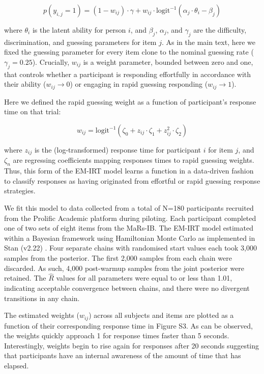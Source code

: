 \documentclass[a4paper,man,natbib]{apa6}
\begin{document}
\begin{equation*}
    p(y_{i,j} = 1) = (1-w_{ij}) \cdot \gamma + w_{ij} \cdot \text{logit}^{-1} \left( \alpha_{j} \cdot \theta_i - \beta_{j} \right)
\end{equation*}

\noindent where $\theta_i$ is the latent ability for person $i$, and $\beta_{j}$, $\alpha_{j}$, and $\gamma_{j}$ are the difficulty, discrimination, and guessing parameters for item $j$. As in the main text, here we fixed the guessing parameter for every item clone to the nominal guessing rate ($\gamma_{j} = 0.25$). Crucially, $w_{ij}$ is a weight parameter, bounded between zero and one, that controls whether a participant is responding effortfully in accordance with their ability ($w_{ij} \rightarrow 0$) or engaging in rapid guessing responding ($w_{ij} \rightarrow 1$).

Here we defined the rapid guessing weight as a function of participant's response time on that trial:

\begin{equation*}
    w_{ij} = \text{logit}^{-1} \left( \zeta_0 + z_{ij} \cdot \zeta_1 + z_{ij}^2 \cdot \zeta_2 \right)
\end{equation*}

\noindent where $z_{ij}$ is the (log-transformed) response time for participant $i$ for item $j$, and  $\zeta_n$ are regressing coefficients mapping responses times to rapid guessing weights. Thus, this form of the EM-IRT model learns a function in a data-driven fashion to classify responses as having originated from effortful or rapid guessing response strategies. 

We fit this model to data collected from a total of N=180 participants recruited from the Prolific Academic platform during piloting. Each participant completed one of two sets of eight items from the MaRs-IB. The EM-IRT model estimated within a Bayesian framework using Hamiltonian Monte Carlo as implemented in Stan (v2.22) \citep{carpenter2017stan}. Four separate chains with randomised start values each took 3,000 samples from the posterior. The first 2,000 samples from each chain were discarded. As such, 4,000 post-warmup samples from the joint posterior were retained. The $\hat{R}$ values for all parameters were equal to or less than 1.01, indicating acceptable convergence between chains, and there were no divergent transitions in any chain.  

The estimated weights ($w_{ij}$) across all subjects and items are plotted as a function of their corresponding response time in Figure S3. As can be observed, the weights quickly approach 1 for response times faster than 5 seconds. Interestingly, weights begin to rise again for responses after 20 seconds suggesting that participants have an internal awareness of the amount of time that has elapsed.
\end{document}
